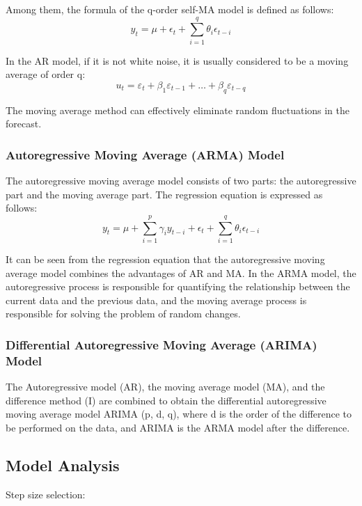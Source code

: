 \documentclass[12pt]{article}  %
\begin{document}
Among them, the formula of the q-order self-MA model is defined as follows:
\begin{equation}\label{eq:MR_1}
    y_{t}=\mu+\epsilon_{t}+\sum_{i=1}^{q} \theta_{i} \epsilon_{t-i}
\end{equation}

In the AR model, if it is not white noise, it is usually considered to be a moving average of order q:
\begin{equation}\label{eq:MR_2}
u_{t}=\varepsilon_{t}+\beta_{1} \varepsilon_{t-1}+\ldots+\beta_{q} \varepsilon_{t-q}
\end{equation}

The moving average method can effectively eliminate random fluctuations in the forecast.


\subsubsection{Autoregressive Moving Average (ARMA) Model}
The autoregressive moving average model consists of two parts: the autoregressive part and the moving average part. The regression equation is expressed as follows:
\begin{equation}\label{eq:ARMA}
    y_{t}=\mu+\sum_{i=1}^{p} \gamma_{i} y_{t-i}+\epsilon_{t}+\sum_{i=1}^{q} \theta_{i} \epsilon_{t-i}
\end{equation}

It can be seen from the regression equation that the autoregressive moving average model combines the advantages of AR and MA. In the ARMA model, the autoregressive process is responsible for quantifying the relationship between the current data and the previous data, and the moving average process is responsible for solving the problem of random changes.


\subsubsection{Differential Autoregressive Moving Average (ARIMA) Model}
The Autoregressive model (AR), the moving average model (MA), and the difference method (I) are combined to obtain the differential autoregressive moving average model ARIMA (p, d, q), where d is the order of the difference to be performed on the data, and ARIMA is the ARMA model after the difference.


\subsection{Model Analysis}
Step size selection:
\end{document}

